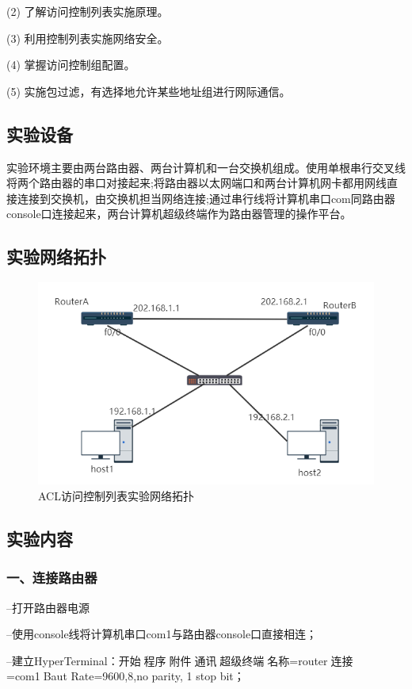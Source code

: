 \documentclass[lang=cn,11pt,a4paper,cite=authoryear]{elegantpaper}
\begin{document}
(2)	了解访问控制列表实施原理。

(3)	利用控制列表实施网络安全。

(4)	掌握访问控制组配置。

(5)	实施包过滤，有选择地允许某些地址组进行网际通信。

\subsection{实验设备}

实验环境主要由两台路由器、两台计算机和一台交换机组成。使用单根串行交叉线将两个路由器的串口对接起来;将路由器以太网端口和两台计算机网卡都用网线直接连接到交换机，由交换机担当网络连接;通过串行线将计算机串口com同路由器console口连接起来，两台计算机超级终端作为路由器管理的操作平台。

\subsection{实验网络拓扑}


\begin{figure}[htbp]
	\centering
	\includegraphics[width=0.7\linewidth]{image/screenshot024}
	\caption{ACL访问控制列表实验网络拓扑}
	\label{fig:acl}
\end{figure}

\subsection{实验内容}

\subsubsection{一、连接路由器}

--打开路由器电源

--使用console线将计算机串口com1与路由器console口直接相连；

--建立HyperTerminal：开始程序附件通讯超级终端名称=router连接=com1Baut Rate=9600,8,no parity, 1 stop bit；
\end{document}
